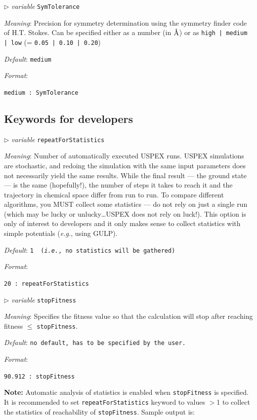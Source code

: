 \documentclass[12pt]{article}
\newcommand{\keyword}[1]{\texttt{#1}}
\newcommand{\paramacro}[6]{
\vspace{0.5cm}
$\triangleright$ \emph{variable} {\color{blue} \texttt{#1}}

\emph{Meaning}: {#2}

{#3}

\emph{Default}: \texttt{#4}

\emph{Format}:

{\addtolength{\leftskip}{10mm} 
\texttt{#5}
\par}


{\small #6}

}
\begin{document}
\paramacro{SymTolerance}{Precision for symmetry determination using the symmetry
finder code of H.T. Stokes. Can be specified either as a number (in
$\text{\r{A}}$) or as \texttt{high | medium | low}
(= \texttt{0.05 | 0.10 | 0.20})}{} {medium}{medium : SymTolerance}{}



\subsection{Keywords for developers}

\paramacro{repeatForStatistics}{Number of automatically executed USPEX runs.
USPEX simulations are stochastic, and redoing the simulation with the same input
parameters does not necessarily yield the same results. While the final result
--- the ground state --- is the same (hopefully!), the number of steps it takes
to reach it and the trajectory in chemical space differ from run to run. To
compare different algorithms, you MUST collect some statistics --- do not rely
on just a single run (which may be lucky or unlucky\ldots USPEX does not rely on
luck!). This option is only of interest to developers and it only makes sense to
collect statistics with simple potentials (\emph{e.g.}, using GULP). }{}{1 {\rm
(\emph{i.e.}, no statistics will be gathered)}}{20 : repeatForStatistics}{}

\paramacro{stopFitness}{Specifies the fitness value so that the calculation will
stop after reaching fitness $\leq$ \keyword{stopFitness}.}{}{\rm no default, has
to be specified by the user.}{90.912 : stopFitness}{}

\textbf{Note:} Automatic analysis of statistics is enabled when
\keyword{stopFitness} is specified. It is recommended to set
\keyword{repeatForStatistics} keyword to values $>$1 to collect the statistics
of reachability of \keyword{stopFitness}. Sample output is:
\end{document}
